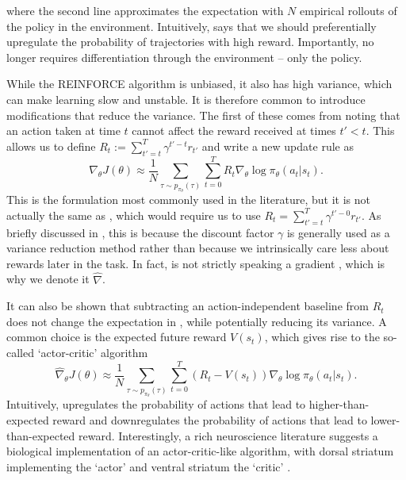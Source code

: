 where the second line approximates the expectation with $N$ empirical rollouts of the policy in the environment.
Intuitively,  says that we should preferentially upregulate the probability of trajectories with high reward.
Importantly,  no longer requires differentiation through the environment -- only the policy.

While the REINFORCE algorithm is unbiased, it also has high variance, which can make learning slow and unstable.
It is therefore common to introduce modifications that reduce the variance.
The first of these comes from noting that an action taken at time $t$ cannot affect the reward received at times $t'<t$.
This allows us to define $R_t := \sum_{t'=t}^T \gamma^{t'-t} r_{t'}$ and write a new update rule as
\begin{equation}
    \label{eq:reinforce}
    \hat{\nabla}_\theta J(\theta) \approx \frac{1}{N} \sum_{\tau \sim p_{\pi_\theta}(\tau)}  \sum_{t=0}^T R_t \nabla_\theta \log \pi_\theta (a_t|s_t).
\end{equation}
This is the formulation most commonly used in the literature, but it is not actually the same as , which would require us to use $R_t = \sum_{t'=t}^T \gamma^{t'-0} r_{t'}$.
As briefly discussed in , this is because the discount factor $\gamma$ is generally used as a variance reduction method rather than because we intrinsically care less about rewards later in the task.
In fact,  is not strictly speaking a gradient \citep{nota2019policy}, which is why we denote it $\hat{\nabla}$.

It can also be shown that subtracting an action-independent baseline from $R_t$ does not change the expectation in , while potentially reducing its variance.
A common choice is the expected future reward $V(s_t)$, which gives rise to the so-called `actor-critic' algorithm
\begin{equation}
    \label{eq:AC}
    \hat{\nabla}_\theta J(\theta) \approx \frac{1}{N} \sum_{\tau \sim p_{\pi_\theta}(\tau)}  \sum_{t=0}^T (R_t - V(s_t)) \nabla_\theta \log \pi_\theta (a_t|s_t).
\end{equation}
Intuitively,  upregulates the probability of actions that lead to higher-than-expected reward and downregulates the probability of actions that lead to lower-than-expected reward.
Interestingly, a rich neuroscience literature suggests a biological implementation of an actor-critic-like algorithm, with dorsal striatum implementing the `actor' and ventral striatum the `critic' \citep{takahashi2008silencing,sutton2018reinforcement}.

